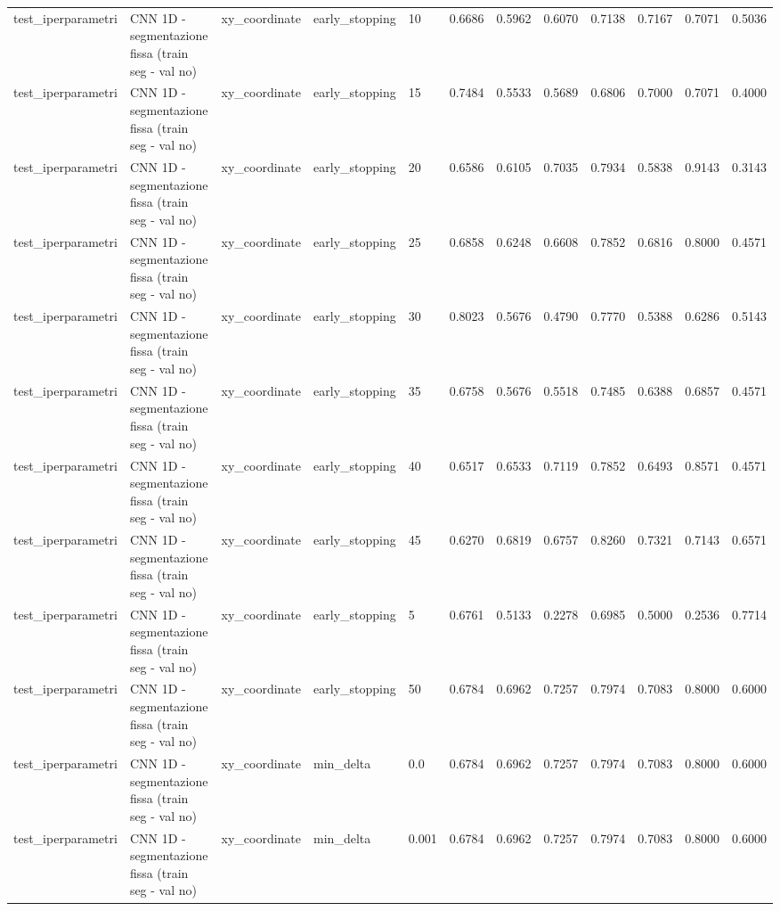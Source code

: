 \documentclass{article}
\begin{document}
\begin{table}[htbp]
\begin{adjustbox}{max width=\textwidth}
\begin{tabular}{lllllrrrrrrr}
test\_iperparametri & CNN 1D - segmentazione fissa (train seg - val no) & xy\_coordinate & early\_stopping & 10 & 0.6686 & 0.5962 & 0.6070 & 0.7138 & 0.7167 & 0.7071 & 0.5036 \\
test\_iperparametri & CNN 1D - segmentazione fissa (train seg - val no) & xy\_coordinate & early\_stopping & 15 & 0.7484 & 0.5533 & 0.5689 & 0.6806 & 0.7000 & 0.7071 & 0.4000 \\
test\_iperparametri & CNN 1D - segmentazione fissa (train seg - val no) & xy\_coordinate & early\_stopping & 20 & 0.6586 & 0.6105 & 0.7035 & 0.7934 & 0.5838 & 0.9143 & 0.3143 \\
test\_iperparametri & CNN 1D - segmentazione fissa (train seg - val no) & xy\_coordinate & early\_stopping & 25 & 0.6858 & 0.6248 & 0.6608 & 0.7852 & 0.6816 & 0.8000 & 0.4571 \\
test\_iperparametri & CNN 1D - segmentazione fissa (train seg - val no) & xy\_coordinate & early\_stopping & 30 & 0.8023 & 0.5676 & 0.4790 & 0.7770 & 0.5388 & 0.6286 & 0.5143 \\
test\_iperparametri & CNN 1D - segmentazione fissa (train seg - val no) & xy\_coordinate & early\_stopping & 35 & 0.6758 & 0.5676 & 0.5518 & 0.7485 & 0.6388 & 0.6857 & 0.4571 \\
test\_iperparametri & CNN 1D - segmentazione fissa (train seg - val no) & xy\_coordinate & early\_stopping & 40 & 0.6517 & 0.6533 & 0.7119 & 0.7852 & 0.6493 & 0.8571 & 0.4571 \\
test\_iperparametri & CNN 1D - segmentazione fissa (train seg - val no) & xy\_coordinate & early\_stopping & 45 & 0.6270 & 0.6819 & 0.6757 & 0.8260 & 0.7321 & 0.7143 & 0.6571 \\
test\_iperparametri & CNN 1D - segmentazione fissa (train seg - val no) & xy\_coordinate & early\_stopping & 5 & 0.6761 & 0.5133 & 0.2278 & 0.6985 & 0.5000 & 0.2536 & 0.7714 \\
test\_iperparametri & CNN 1D - segmentazione fissa (train seg - val no) & xy\_coordinate & early\_stopping & 50 & 0.6784 & 0.6962 & 0.7257 & 0.7974 & 0.7083 & 0.8000 & 0.6000 \\
test\_iperparametri & CNN 1D - segmentazione fissa (train seg - val no) & xy\_coordinate & min\_delta & 0.0 & 0.6784 & 0.6962 & 0.7257 & 0.7974 & 0.7083 & 0.8000 & 0.6000 \\
test\_iperparametri & CNN 1D - segmentazione fissa (train seg - val no) & xy\_coordinate & min\_delta & 0.001 & 0.6784 & 0.6962 & 0.7257 & 0.7974 & 0.7083 & 0.8000 & 0.6000 \\

\end{tabular}
\end{adjustbox}
\end{table}
\end{document}

